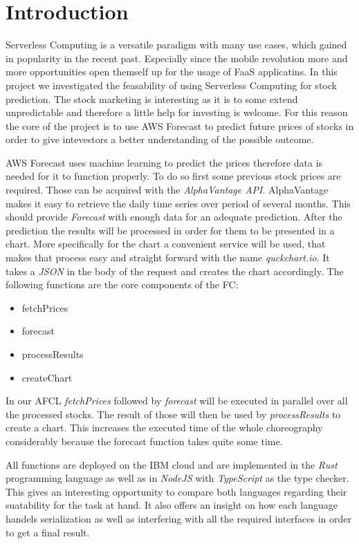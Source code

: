 %
%
%
\chapter{\label{chap:introduction}Introduction}

Serverless Computing is a versatile paradigm with many use cases, which gained
in popularity in the recent past.  Especially since the mobile revolution more
and more opportunities open themself up for the usage of FaaS applicatins.  In
this project we investigated the feasability of using Serverless Computing for
stock prediction. The stock marketing is interesting as it is to some extend
unpredictable and therefore a little help for investing is welcome. For this
reason the core of the project is to use AWS Forecast to predict future prices
of stocks in order to give intevestors a better understanding of the possible
outcome.

AWS Forecast uses machine learning to predict the prices therefore data is
needed for it to function properly. To do so first some previous stock prices
are required. Those can be acquired with the \textit{AlphaVantage API}.
AlphaVantage makes it easy to retrieve the daily time series over period of
several months. This should provide \textit{Forecast} with enough data for an
adequate prediction. After the prediction the results will be processed in
order for them to be presented in a chart. More specifically for the chart a
convenient service will be used, that makes that process easy and straight
forward with the name \textit{quckchart.io}. It takes a \textit{JSON} in the
body of the request and creates the chart accordingly. The following functions
are the core components of the FC:

\begin{itemize}
  \item fetchPrices
  \item forecast
  \item processResults
  \item createChart
\end{itemize}

In our AFCL \textit{fetchPrices} followed by \textit{forecast} will be executed
in parallel over all the processed stocks. The result of those will then be
used by \textit{processResults} to create a chart. This increases the executed
time of the whole choreography considerably because the forecast function takes
quite some time.

All functions are deployed on the IBM cloud and are
implemented in the \textit{Rust} programming language as well as in
\textit{NodeJS} with \textit{TypeScript} as the type checker. This gives an
interesting opportunity to compare both languages regarding their suatability
for the task at hand. It also offers an insight on how each language handels
serialization as well as interfering with all the required interfaces in order
to get a final result.

